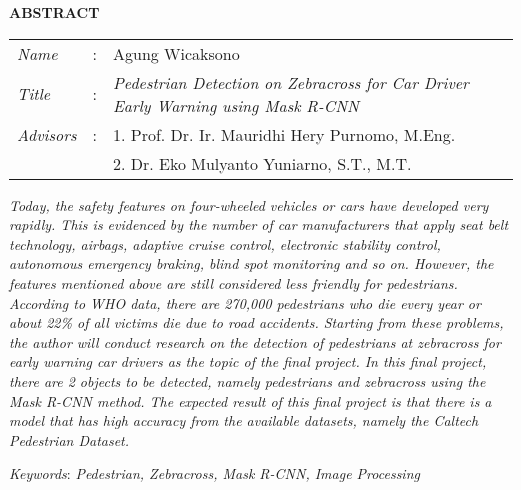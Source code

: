 \begin{center}
  \large\textbf{ABSTRACT}
\end{center}


\vspace{2ex}

\begingroup
  \setlength{\tabcolsep}{0pt}

  \noindent
  \begin{tabularx}{\textwidth}{l >{\centering}m{3em} X}
    \emph{Name}     &:& Agung Wicaksono \\

    \emph{Title}    &:& \emph{Pedestrian Detection on \textit{Zebracross} for Car Driver Early Warning using \textit{Mask R-CNN}} \\

    \emph{Advisors}  &:& 1. Prof. Dr. Ir. Mauridhi Hery Purnomo, M.Eng. \\
    				 & & 2. Dr. Eko Mulyanto Yuniarno, S.T., M.T. \\
  \end{tabularx}
\endgroup

\emph{Today, the safety features on four-wheeled vehicles or cars have developed very rapidly. This is evidenced by the number of car manufacturers that apply seat belt technology, airbags, adaptive cruise control, electronic stability control, autonomous emergency braking, blind spot monitoring and so on. However, the features mentioned above are still considered less friendly for pedestrians. According to WHO data, there are 270,000 pedestrians who die every year or about 22\% of all victims die due to road accidents. Starting from these problems, the author will conduct research on the detection of pedestrians at zebracross for early warning car drivers as the topic of the final project. In this final project, there are 2 objects to be detected, namely pedestrians and zebracross using the Mask R-CNN method. The expected result of this final project is that there is a model that has high accuracy from the available datasets, namely the Caltech Pedestrian Dataset.}

\emph{Keywords}: \emph{Pedestrian, Zebracross, Mask R-CNN, Image Processing}
